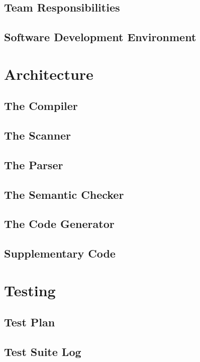 \documentclass{article}
\begin{document}
\subsection{Team Responsibilities}

\subsection{Software Development Environment}


\section{Architecture}

\subsection{The Compiler}

\subsection{The Scanner}

\subsection{The Parser}

\subsection{The Semantic Checker}

\subsection{The Code Generator}

\subsection{Supplementary Code} %


\section{Testing}

\subsection{Test Plan}

\subsection{Test Suite Log}
\end{document}
